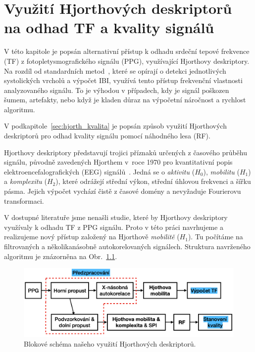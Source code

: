
\chapter{Využití Hjorthových deskriptorů na odhad TF a kvality signálů}
\label{ch:hjorth}
V této kapitole je popsán alternativní přístup k odhadu srdeční tepové frekvence (\acs{TF}) z fotopletysmografického signálu (\acs{PPG}), využívající Hjorthovy deskriptory.
Na rozdíl od standardních metod~\cite{ENIKÖ,Charlton2022,NeuroKit2}, které se opírají o detekci jednotlivých systolických vrcholů a výpočet \acs{IBI}, využívá tento přístup frekvenční vlastnosti analyzovaného signálu.
To je výhodou v případech, kdy je signál poškozen šumem, artefakty, nebo když je kladen důraz na výpočetní náročnost a rychlost algoritmu.

V podkapitole~\ref{sec:hjorth_kvalita} je popsán způsob využití Hjorthových deskriptorů pro odhad kvality signálu pomocí náhodného lesa (\acs{RF}).

Hjorthovy deskriptory představují trojici příznaků určených z časového průběhu signálu, původně zavedených Hjorthem v~roce 1970 pro kvantitativní popis elektroencefalografických (\acs{EEG}) signálů~\cite{Hjorth1970,Hjorth1973}.
Jedná se o \textit{aktivitu} (\(H_0\)), \textit{mobilitu} (\(H_1\)) a \textit{komplexitu} (\(H_2\)), které odrážejí střední výkon, střední úhlovou frekvenci a šířku pásma.
Jejich výpočet vychází čistě z časové domény a nevyžaduje Fourierovu transformaci.

V dostupné literatuře jsme nenašli studie, které by Hjorthovy deskriptory využívaly k odhadu \acs{TF} z \acs{PPG} signálu.
Proto v této práci navrhujeme a realizujeme nový přístup založený na Hjorthově \textit{mobilitě} (\(H_1\)).
Tu počítáme na filtrovaných a několikanásobně autokorelovaných signálech.
Struktura navrženého algoritmu je znázorněna na Obr.~\ref{fig:hjorth_schemata}.

\begin{figure}[h]
	\centering
	\includegraphics[width=1\textwidth]{./obrazky/hjorth_schema.png}
	\caption[Schéma našeho algorimu, který využívá Hjorthových deskriptorů]{Blokové schéma našeho využití Hjorthových deskriptorů.}
	\label{fig:hjorth_schemata}
\end{figure}

